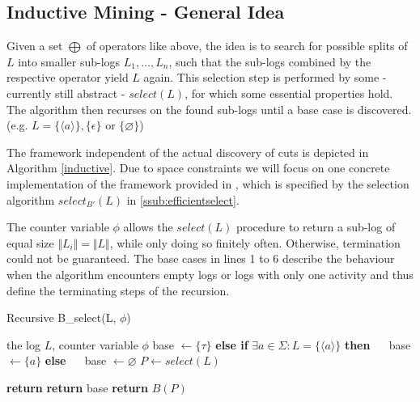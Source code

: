 \documentclass[a4paper]{IEEEtran}
\begin{document}
\subsection{Inductive Mining - General Idea}
Given a set $\bigoplus$ of operators like above, the idea is to search for possible splits of $L$ into smaller sub-logs $L_1, \dots, L_n$, such that the sub-logs combined by the respective operator yield $L$ again. This selection step is performed by some - currently still abstract - $select(L)$, for which some essential properties hold. The algorithm then recurses on the found sub-logs until a base case is discovered. (e.g. $L = \{ \langle a \rangle \}, \{ \epsilon \}$ or $\{ \varnothing \}$)

The framework independent of the actual discovery of cuts is depicted in Algorithm \ref{inductive}. Due to space constraints we will focus on one concrete implementation of the framework provided in \cite{inductivemining-constructive}, which is specified by the selection algorithm $select_{B'}(L)$ in \ref{ssub:efficientselect}. 

The counter variable $\phi$ allows the $select(L)$ procedure to return a sub-log of equal size $\Vert L_i \Vert = \Vert L \Vert$, while only doing so finitely often. Otherwise, termination could not be guaranteed. The base cases in lines 1 to 6 describe the behaviour when the algorithm encounters empty logs or logs with only one activity and thus define the terminating steps of the recursion.

\begin{algorithm}[h!]
\caption{Recursive B_{select}(L, $\phi$)}
\label{inductive-mining}
\begin{algorithmic}[1]
\Require the log $L$, counter variable $\phi$
 
    \State base $\gets \{\tau\}$
\EndIf
\State \textbf{else if} $ \exists a \in \Sigma : L =  \{ \langle a \rangle \}$ \textbf{then}
    \State $\quad$  base $\gets \{ a \}$ 
\State \textbf{else}
    \State $\quad$  base $\gets \varnothing$ 
\State $P \gets select(L)$

        \State \textbf{return}  
    \Else 
        \State \textbf{return} base
    \EndIf
\EndIf
\State \textbf{return} $B(P)$ 
\end{algorithmic}
\label{inductive}
\end{algorithm}
\end{document}
